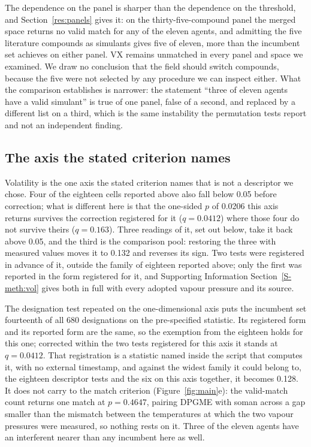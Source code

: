 \documentclass[journal=ancham,manuscript=article,margin=1in]{achemso}
\begin{document}
The dependence on the panel is sharper than the dependence on the threshold, and
Section~\ref{res:panels} gives it: on the thirty-five-compound panel the merged
space returns no valid match for any of the eleven agents, and admitting the
five literature compounds as simulants gives five of eleven, more than the
incumbent set achieves on either panel. VX remains unmatched in every panel and
space we examined. We draw no conclusion that the field should switch compounds,
because the five were not selected by any procedure we can inspect either. What
the comparison establishes is narrower: the statement ``three of eleven agents
have a valid simulant'' is true of one panel, false of a second, and replaced by
a different list on a third, which is the same instability the permutation tests
report and not an independent finding.

\subsection{The axis the stated criterion names}
\label{res:vol}
Volatility is the one axis the stated criterion names that is not a descriptor
we chose. Four of the eighteen cells reported above also fall below 0.05 before
correction; what is different here is that the one-sided $p$ of 0.0206 this
axis returns survives the correction registered for it ($q = 0.0412$) where
those four do not survive theirs ($q = 0.163$). Three readings of it,
set out below, take it back above 0.05, and the third is the comparison pool:
restoring the three with measured values moves it to 0.132 and reverses
its sign. Two tests were registered in advance of it,
outside the family of eighteen reported above; only the first was reported in
the form registered for it, and Supporting Information
Section~\ref{S-meth:vol} gives both in full with every adopted vapour pressure
and its source.

The designation test repeated on the one-dimensional axis puts the incumbent set
fourteenth of all 680 designations on the pre-specified statistic. Its registered form and its reported form are the same, so the
exemption from the eighteen holds for this one; corrected within the two tests
registered for this axis it stands at $q = 0.0412$. That registration is a
statistic named inside the script that computes it, with no external timestamp,
and against the widest family it could belong to, the eighteen descriptor
tests and the six on this axis together, it becomes 0.128. It does not carry to the match criterion
(Figure~\ref{fig:main}e): the valid-match count returns one match at
$p = 0.4647$, pairing DPGME with soman across a gap smaller than the mismatch between the temperatures
at which the two vapour pressures were measured, so nothing rests on it. Three
of the eleven agents have an interferent nearer than any incumbent here as
well.
\end{document}
